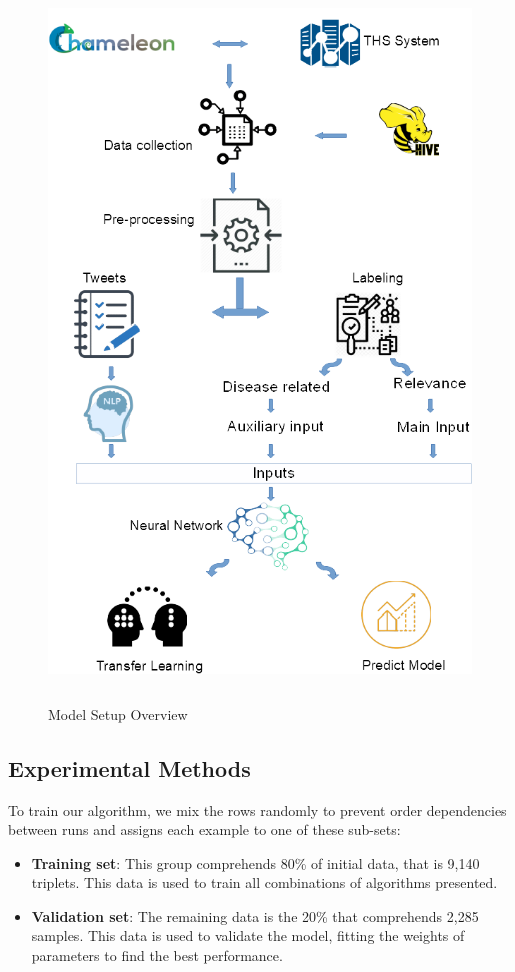 \documentclass[12pt]{report}
\begin{document}
\begin{figure}[H]	
	\centering
	\includegraphics[height=190mm,  scale = 0.8]{images/10_architecture_setup.png}	
	\caption{Model Setup Overview}	
	\label{figure:model_setup}
\end{figure}

\subsection{Experimental Methods} \label{experimental_methods}

To train our algorithm, we mix the rows randomly to prevent order dependencies between runs and assigns each example to one of these
sub-sets:

\begin{itemize}[nolistsep]
	\item \textbf{Training set}: This group comprehends 80\% of initial data, that is 9,140 triplets. This data is used to train all combinations of algorithms presented.
	\item \textbf{Validation set}:  The remaining data is the 20\% that comprehends 2,285 samples. This data is used to validate the model, fitting the weights of parameters to find the best performance.
\end{itemize}
\end{document}
